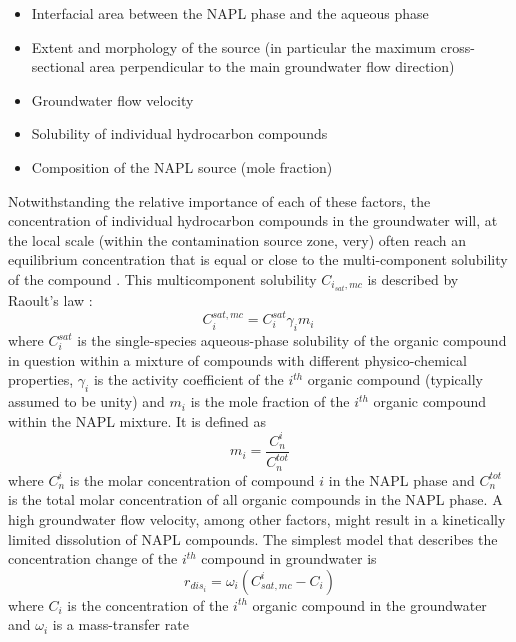 \begin{itemize}
    \item Interfacial area between the NAPL phase and the aqueous phase
    \item Extent and morphology of the source (in particular the
maximum cross-sectional area perpendicular to the main groundwater
flow direction)
    \item Groundwater flow velocity
    \item Solubility of individual hydrocarbon compounds
    \item Composition of the NAPL source (mole fraction)
\end{itemize}

Notwithstanding the relative importance of each of these factors,
the concentration of individual hydrocarbon compounds in the
groundwater will, at the local scale (within the contamination source zone, very) often
reach an equilibrium concentration that is equal or close to the
multi-component solubility of the compound \citep{eberhardt02}.
This multicomponent solubility $C_{i_{sat},mc}$ is described
by Raoult's law \citep{schwarzb}:
\begin{equation}
{C_{i}^{sat,mc} = C_{i}^{sat} \gamma_{i} m_{i} \ }
\label{eq:raoult2}
\end{equation}
where $C_{i}^{sat}$ is the single-species aqueous-phase
solubility
\citep[available from tabulated sources, e.g.,][]{schwarzb} 
of the organic compound in question within a
mixture of compounds with different physico-chemical properties,
$\gamma_{i}$ is the activity coefficient of the $i^{th}$ organic
compound (typically assumed to be unity) and $m_{i}$ is the
mole fraction of the $i^{th}$ organic compound within the NAPL
mixture. It is defined as
\begin{equation}
{m_i  = \frac {C_n^i} {C_n^{tot}}} \label{eq:raoult_mc}
\end{equation}
where $C_n^i$ is the molar concentration of compound $i$ in the
NAPL phase and $C_n^{tot}$ is the total molar concentration of all
organic compounds in the NAPL phase. A high groundwater flow
velocity, among other factors, might result in a kinetically
limited dissolution of NAPL compounds. The simplest model that
describes the concentration change of the $i^{th}$ compound in
groundwater is
\begin{equation}
{r_{dis_i} = \omega_i (C_{sat,mc}^i - C_i)}
\label{eq:raoult_dis}
\end{equation}
where $C_{i}$ is the concentration of the $i^{th}$ organic
compound in the groundwater and $\omega_i$ is a mass-transfer rate
